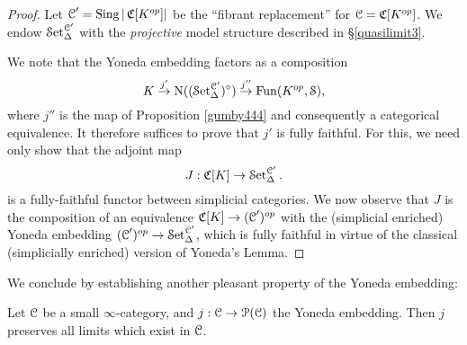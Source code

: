 \begin{proof}
Let $\operatorname{\mathcal{C}}' = \operatorname{Sing} | \operatorname{\mathfrak{C}}[K^{op}] |$ be the ``fibrant
replacement'' for $\operatorname{\mathcal{C}}=\operatorname{\mathfrak{C}}[K^{op}]$. We endow
$\operatorname{\mathcal{S}et}_{\Delta}^{\operatorname{\mathcal{C}}'}$ with the {\em projective} model structure described in \S \ref{quasilimit3}.

We note that the Yoneda embedding factors as a composition
$$ K \stackrel{j'}{\rightarrow} \operatorname{N}( (\operatorname{\mathcal{S}et}_{\Delta}^{\operatorname{\mathcal{C}}'})^{\circ} )
\stackrel{j''}{\rightarrow} \operatorname{Fun}( K^{op}, \operatorname{\mathcal{S}}),$$ where $j''$ is the map of Proposition \ref{gumby444} and consequently a categorical equivalence. It therefore suffices to
prove that $j'$ is fully faithful. For this, we need only show
that the adjoint map
$$ J: \operatorname{\mathfrak{C}}[K] \rightarrow \operatorname{\mathcal{S}et}_{\Delta}^{\operatorname{\mathcal{C}}'}.$$
is a fully-faithful functor between simplicial categories. We now observe that
$J$ is the composition of an equivalence $\operatorname{\mathfrak{C}}[K] \rightarrow (\operatorname{\mathcal{C}}')^{op}$
with the (simplicial enriched) Yoneda embedding 
$(\operatorname{\mathcal{C}}')^{op} \rightarrow \operatorname{\mathcal{S}et}_{\Delta}^{\operatorname{\mathcal{C}}'}$, which is fully faithful
in virtue of the classical (simplicially enriched) version of Yoneda's Lemma.
\end{proof}

We conclude by establishing another pleasant property of the Yoneda
embedding:

\begin{proposition}\label{yonedaprop}
Let $\operatorname{\mathcal{C}}$ be a small $\infty$-category, and $j: \operatorname{\mathcal{C}} \rightarrow \operatorname{\mathcal{P}}(\operatorname{\mathcal{C}})$ the Yoneda embedding. Then $j$ preserves all limits which exist in $\operatorname{\mathcal{C}}$.
\end{proposition}

